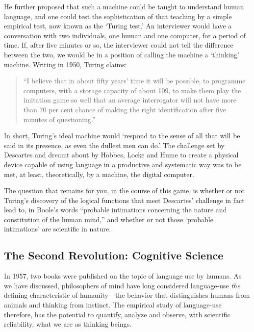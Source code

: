 \begin{refsection}
He further proposed that such a machine could be taught to understand human language, and one could test the sophistication of that teaching by a simple empirical test, now known as the `Turing test.' An interviewer would have a conversation with two individuals, one human and one computer, for a period of time. If, after five minutes or so, the interviewer could not tell the difference between the two, we would be in a position of calling the machine a `thinking' machine. Writing in 1950, Turing claims:

\begin{quote}

``I believe that in about fifty years' time it will be possible, to programme computers, with a storage capacity of about 109, to make them play the imitation game so well that an average interrogator will not have more than 70 per cent chance of making the right identification after five minutes of questioning.''
\end{quote}

In short, Turing's ideal machine would `respond to the sense of all that will be said in its presence, as even the dullest men can do.' The challenge set by Descartes and dreamt about by Hobbes, Locke and Hume to create a physical device capable of using language in a productive and systematic way was to be met, at least, theoretically, by a machine, the digital computer.

The question that remains for you, in the course of this game, is whether or not Turing's discovery of the logical functions that meet Descartes' challenge in fact lead to, in Boole's words ``probable intimations concerning the nature and constitution of the human mind,'' and whether or not those `probable intimations' are scientific in nature.

\subsection{The Second Revolution: Cognitive Science}
\label{thesecondrevolution:cognitivescience}

In 1957, two books were published on the topic of language use by humans. As we have discussed, philosophers of mind have long considered language-use \emph{the} defining characteristic of humanity---the behavior that distinguishes humans from animals and thinking from instinct. The empirical study of language-use therefore, has the potential to quantify, analyze and observe, with scientific reliability, what we are as thinking beings.


\end{refsection}
